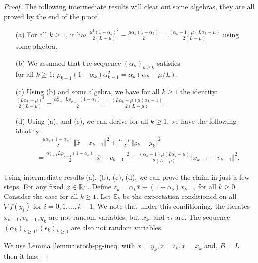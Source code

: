 \documentclass[12pt]{article}
\newcommand{\expect}{\ensuremath{\mathbb E}}
\begin{document}
    \begin{proof}
        The following intermediate results will clear out some algebras, they are all proved by the end of the proof. 
        \begin{enumerate}
            \item [(a)] For all $k \ge 1$, it has $\frac{\mu^2(1 - \alpha_k)^2}{2(L - \mu)} - \frac{\mu\alpha_k(1 - \alpha_k)}{2} = \frac{(\alpha_k - 1)\mu\left(L\alpha_k - \mu\right)}{2\left(L - \mu\right)}$ using some algebra. 
            \item [(b)] We assumed that the sequence $(\alpha_k)_{k \ge 0}$ satisfies\\ for all $k \ge 1$: $\rho_{k - 1}(1 - \alpha_{k})\alpha_{k - 1}^2 = \alpha_{k}(\alpha_{k} - \mu/L)$. 
            \item [(c)] Using (b) and some algebra, we have for all $k \ge 1$ the identity: \\
            $\frac{(L\alpha_k - \mu)^2}{2(L - \mu)} - \frac{\alpha_{k - 1}^2 L \rho_{k - 1}(1 - \alpha_k)}{2} = \frac{(L\alpha_k - \mu)\mu(\alpha_k - 1)}{2(L - \mu)}$. 
            \item [(d)] Using (a), and (c), we can derive for all $k\ge 1$, we have the following identity: 
            \begin{align*}
                & - \frac{\mu\alpha_k(1 - \alpha_k)}{2}\Vert \bar x - x_{k - 1}\Vert^2
                + \frac{L - \mu}{2}\Vert z_k - y_k\Vert^2
                \\ &= 
                \frac{\alpha_{k - 1}^2L \rho_{k - 1}(1 - \alpha_k)}{2}\Vert \bar x - v_{k - 1}\Vert^2
                + \frac{(\alpha_k - 1)\mu(L\alpha_k - \mu)}{2(L - \mu)}\Vert x_{k - 1} - v_{k - 1}\Vert^2. 
            \end{align*}
        \end{enumerate}
        Using intermediate results (a), (b), (c), (d), we can prove the claim in just a few steps. 
        For any fixed $\bar x \in \mathbb R^n$. 
        Define $z_k = \alpha_k \bar x + (1 - \alpha_k)x_{k - 1}$ for all $k \ge 0$. 
        Consider the case for all $k \ge 1$. 
        Let $\expect_{k}$ be the expectation conditioned on all $\tilde \nabla f(y_i)$ for $i = 0, 1, \ldots, k - 1$. 
        We note that under this conditioning, the iterates $x_{k - 1}, v_{k - 1}, y_k$ are not random variables, but $x_k$, and $v_k$ are. 
        The sequence $(\alpha_k)_{k \ge 0}, (\epsilon_k)_{k \ge 0}$ are also not random variables. 
        \par
        We use Lemma \ref{lemma:stoch-pg-ineq} with $x = y_k, z = z_k, \tilde x = x_{k}$ and, $B = L$ then it has: 

\end{proof}
\end{document}
